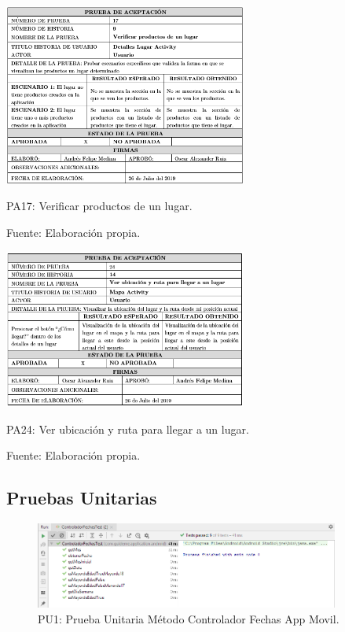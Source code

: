 \documentclass[12pt,letterpaper,openany]{book}
\begin{document}
\begin{table}[H]
\centering
\includegraphics[width=8cm]{./imagenes/PA/PA17}
\caption{PA17: Verificar productos de un lugar.}
\centering Fuente: Elaboración propia.
\end{table}

\begin{table}[H]
\centering
\includegraphics[width=8cm]{./imagenes/PA/PA24}
\caption{PA24: Ver ubicación y ruta para llegar a un lugar.}
\centering Fuente: Elaboración propia.
\end{table}

\subsection{Pruebas Unitarias}
\begin{figure}[H]
\begin{center}
\includegraphics[width=10cm]{./imagenes/Test/ControladorFechasTest}
\caption{PU1: Prueba Unitaria Método Controlador Fechas App Movil.}
\end{center}
\end{figure}
\end{document}
